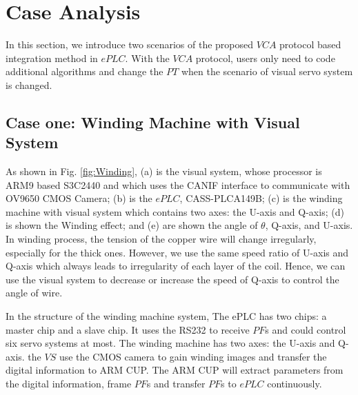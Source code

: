 \documentclass[journal,UTF8]{IEEEtran}
\begin{document}
\section{Case Analysis}
\label{Case}
In this section, we introduce two scenarios of the proposed $VCA$ protocol based integration method in $ePLC$. With the $VCA$ protocol, users only need to code additional algorithms and change the $PT$ when the scenario of visual servo system is changed. 

\subsection{Case one: Winding Machine with Visual System}
  
As shown in Fig. \ref{fig:Winding}, 
(a) is the visual system, whose processor is ARM9 based S3C2440 and which uses the CANIF interface to communicate with OV9650 CMOS Camera; (b) is the $ePLC$, CASS-PLCA149B; (c) is the winding machine with visual system which contains two axes: the U-axis and Q-axis; (d) is shown the Winding effect; and (e) are shown the angle of $\theta$, Q-axis, and U-axis.
 In winding process, the tension of the copper wire will change irregularly, especially for the thick ones. However, we use the same speed ratio of U-axis and Q-axis which always leads to irregularity of each layer of the coil. Hence, we can use the visual system to decrease or increase the speed of Q-axis to control the angle of wire. 

In the structure of the winding machine system, The ePLC has two chips: a master chip and a slave chip. It uses the RS232 to receive $PF$s and could control six servo systems at most. The winding machine has two axes: the U-axis and Q-axis. the $VS$ use the CMOS camera to gain winding images and transfer the digital information to ARM CUP. The ARM CUP will extract parameters from the digital information, frame $PF$s and transfer $PF$s to $ePLC$ continuously. 
\end{document}
